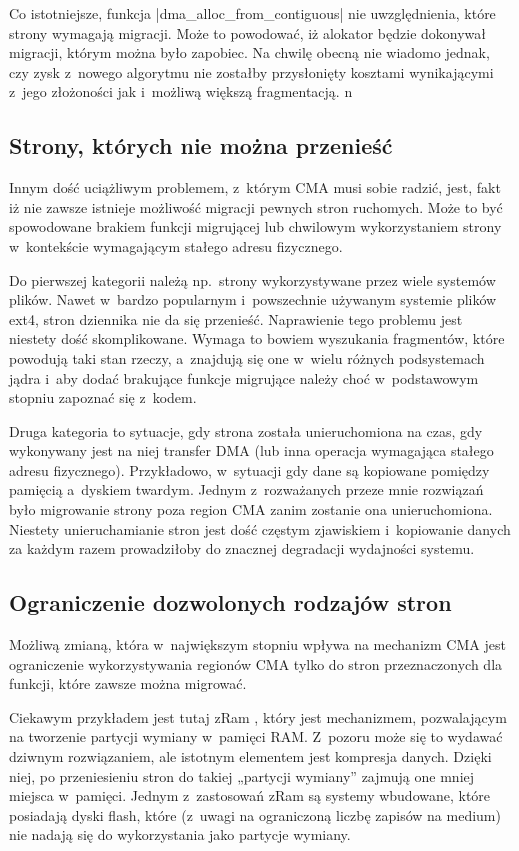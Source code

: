 Co istotniejsze, funkcja \code|dma_alloc_from_contiguous| nie
uwzględnienia, które strony wymagają migracji.  Może to powodować, iż
alokator będzie dokonywał migracji, którym można było zapobiec.  Na
chwilę obecną nie wiadomo jednak, czy zysk z~nowego algorytmu nie
zostałby przysłonięty kosztami wynikającymi z~jego złożoności jak
i~możliwą większą fragmentacją.
n
\subsection{Strony, których nie można przenieść}

Innym dość uciążliwym problemem, z~którym CMA musi sobie radzić, jest,
fakt iż nie zawsze istnieje możliwość migracji pewnych stron
ruchomych.  Może to być spowodowane brakiem funkcji migrującej lub
chwilowym wykorzystaniem strony w~kontekście wymagającym stałego
adresu fizycznego.

Do pierwszej kategorii należą np.\ strony wykorzystywane przez wiele
systemów plików.  Nawet w~bardzo popularnym i~powszechnie używanym
systemie plików ext4, stron dziennika nie da się przenieść.
Naprawienie tego problemu jest niestety dość skomplikowane.  Wymaga to
bowiem wyszukania fragmentów, które powodują taki stan rzeczy,
a~znajdują się one w~wielu różnych podsystemach jądra i~aby dodać
brakujące funkcje migrujące należy choć w~podstawowym stopniu zapoznać
się z~kodem.

Druga kategoria to sytuacje, gdy strona została unieruchomiona na
czas, gdy wykonywany jest na niej transfer DMA (lub inna operacja
wymagająca stałego adresu fizycznego).  Przykładowo, w~sytuacji gdy
dane są kopiowane pomiędzy pamięcią a~dyskiem twardym.  Jednym
z~rozważanych przeze mnie rozwiązań było migrowanie strony poza region
CMA zanim zostanie ona unieruchomiona.  Niestety unieruchamianie stron
jest dość częstym zjawiskiem i~kopiowanie danych za każdym razem
prowadziłoby do znacznej degradacji wydajności systemu.


\subsection{Ograniczenie dozwolonych rodzajów stron}

Możliwą zmianą, która w~największym stopniu wpływa na mechanizm CMA
jest ograniczenie wykorzystywania regionów CMA tylko do stron
przeznaczonych dla funkcji, które zawsze można migrować.

Ciekawym przykładem jest tutaj zRam \autocite{patch:zram}, który jest
mechanizmem, pozwalającym na tworzenie partycji wymiany w~pamięci RAM.
Z~pozoru może się to wydawać dziwnym rozwiązaniem, ale istotnym
elementem jest kompresja danych.  Dzięki niej, po przeniesieniu stron
do takiej „partycji wymiany” zajmują one mniej miejsca w~pamięci.
Jednym z~zastosowań zRam są systemy wbudowane, które posiadają dyski
flash, które (z~uwagi na ograniczoną liczbę zapisów na medium) nie
nadają się do wykorzystania jako partycje wymiany.

